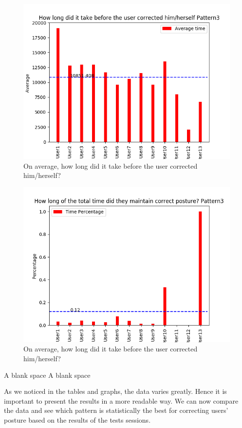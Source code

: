 \documentclass[sigconf]{acmart}
\begin{document}
\begin{figure}[h]
\centering
\includegraphics[width=0.8\columnwidth, scale=1]{p3_q2.png}
\caption{On average, how long did it take before the user corrected him/herself?}
\end{figure}


\begin{figure}[h]
\centering
\includegraphics[width=0.8\columnwidth, scale=1]{p3_q3.png}
\caption{On average, how long did it take before the user corrected him/herself?}
\end{figure}
\pagebreak

{\color{white} A blank space } \linebreak
{\color{white} A blank space } \linebreak

As we noticed in the tables and graphs, the data varies greatly. Hence it is important to present the results in a more readable way. We can now compare the data and see which pattern is statistically the best for correcting users’ posture based on the results of the tests sessions.
\end{document}
